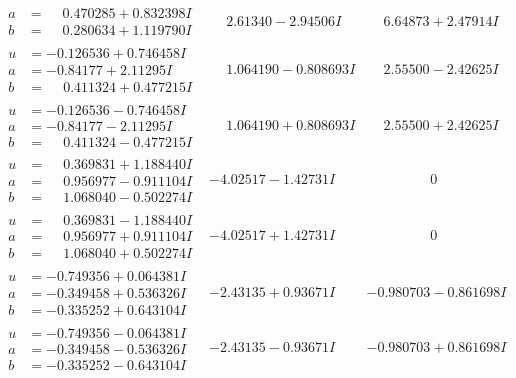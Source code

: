 \documentclass[1p]{elsarticle_modified}
\theoremstyle{definition}
\begin{document}
$$\begin{array}{c|c|c}
\begin{aligned}
a &= \phantom{-}0.470285 + 0.832398 I \\
b &= \phantom{-}0.280634 + 1.119790 I\end{aligned}
 & \phantom{-}2.61340 - 2.94506 I & \phantom{-}6.64873 + 2.47914 I \\ \hline\begin{aligned}
u &= -0.126536 + 0.746458 I \\
a &= -0.84177 + 2.11295 I \\
b &= \phantom{-}0.411324 + 0.477215 I\end{aligned}
 & \phantom{-}1.064190 - 0.808693 I & \phantom{-}2.55500 - 2.42625 I \\ \hline\begin{aligned}
u &= -0.126536 - 0.746458 I \\
a &= -0.84177 - 2.11295 I \\
b &= \phantom{-}0.411324 - 0.477215 I\end{aligned}
 & \phantom{-}1.064190 + 0.808693 I & \phantom{-}2.55500 + 2.42625 I \\ \hline\begin{aligned}
u &= \phantom{-}0.369831 + 1.188440 I \\
a &= \phantom{-}0.956977 - 0.911104 I \\
b &= \phantom{-}1.068040 - 0.502274 I\end{aligned}
 & -4.02517 - 1.42731 I & \phantom{-0.000000 } 0 \\ \hline\begin{aligned}
u &= \phantom{-}0.369831 - 1.188440 I \\
a &= \phantom{-}0.956977 + 0.911104 I \\
b &= \phantom{-}1.068040 + 0.502274 I\end{aligned}
 & -4.02517 + 1.42731 I & \phantom{-0.000000 } 0 \\ \hline\begin{aligned}
u &= -0.749356 + 0.064381 I \\
a &= -0.349458 + 0.536326 I \\
b &= -0.335252 + 0.643104 I\end{aligned}
 & -2.43135 + 0.93671 I & -0.980703 - 0.861698 I \\ \hline\begin{aligned}
u &= -0.749356 - 0.064381 I \\
a &= -0.349458 - 0.536326 I \\
b &= -0.335252 - 0.643104 I\end{aligned}
 & -2.43135 - 0.93671 I & -0.980703 + 0.861698 I \\ \hline\begin{aligned}

\end{aligned}
\end{array}$$
\end{document}

